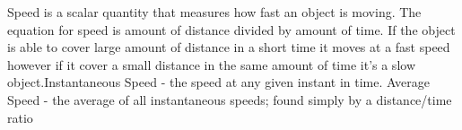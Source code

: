 Speed is a scalar quantity that measures how fast an object is moving. The equation for speed is amount of distance divided by amount of time. If the object is able to cover large amount of distance in a short time it moves at a fast speed however if it cover a small distance in the same amount of time it's a slow object.Instantaneous Speed - the speed at any given instant in time.
Average Speed - the average of all instantaneous speeds; found simply by a distance/time ratio
